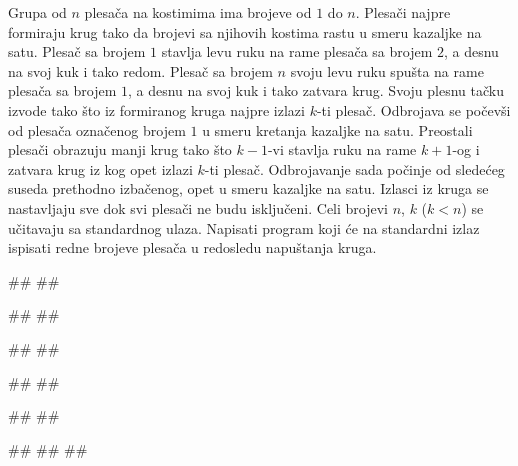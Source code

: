\begin{Exercise}[difficulty=1,label=4_12]
Grupa od $n$ plesača na kostimima ima brojeve od $1$ do $n$. 
Plesači najpre formiraju krug tako da brojevi sa njihovih kostima rastu u smeru kazaljke na satu. Plesač sa brojem $1$ stavlja levu ruku na rame plesača sa brojem $2$, a desnu na svoj kuk i tako redom. Plesač sa brojem $n$ svoju levu ruku spušta na rame plesača sa brojem $1$, a desnu na svoj kuk i tako zatvara krug.
Svoju plesnu tačku izvode tako što iz formiranog kruga najpre izlazi $k$-ti plesač. 
Odbrojava se počevši od plesača označenog brojem $1$ u smeru kretanja kazaljke na satu. 
Preostali plesači obrazuju manji krug tako što $k-1$-vi stavlja ruku na rame $k+1$-og i zatvara krug iz kog opet izlazi $k$-ti plesač. Odbrojavanje sada počinje od
sledećeg suseda prethodno izbačenog, opet u smeru kazaljke na satu. Izlasci iz kruga se nastavljaju
sve dok svi plesači ne budu isključeni. 
Celi brojevi $n$, $k$ ($k < n$) se učitavaju sa standardnog ulaza. 
Napisati program koji će na standardni izlaz ispisati redne brojeve plesača u redosledu napuštanja kruga. 


\begin{minitest}
\begin{test}{1}
#\naslovUlaz#
##

#\naslovIzlaz# 
##
\end{test}
\end{minitest}
\begin{minitest}
\begin{test}{2}
#\naslovUlaz#
##

#\naslovIzlaz# 
## 
\end{test}
\end{minitest}
\begin{minitest}
\begin{test}{3}
#\naslovUlaz#
##

#\naslovIzlazZaGresku# 
##
##
\end{test}
\end{minitest}
\end{Exercise}

